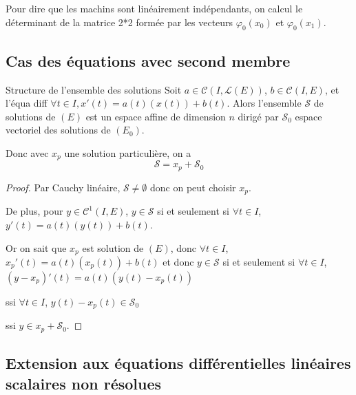 Pour dire que les machins sont linéairement indépendants, on calcul le déterminant 
de la matrice 2*2 formée par les vecteurs $\varphi_0(x_0)$ et $\varphi_0(x_1)$.


\subsection{Cas des équations avec second membre}

\begin{theoreme}{Structure de l'ensemble des solutions}{}
    Soit $a \in \mathscr C(I, \mathscr L(E))$, $b \in \mathscr C(I, E)$, et l'équa diff 
    $\forall t \in I, x'(t) = a(t)(x(t)) + b(t)$. Alors l'ensemble $\mathscr S$ de solutions 
    de $(E)$ est un espace affine de dimension $n$ dirigé par $\mathscr S_0$ espace 
    vectoriel des solutions de $(E_0)$. 

    Donc avec $x_p$ une solution particulière, on a 
    $$\mathscr S = x_p + \mathscr S_0$$
\end{theoreme}

\begin{proof}
    Par Cauchy linéaire, $\mathscr S \neq \emptyset$ donc on peut 
    choisir $x_p$. 
    
    De plus, pour $y \in \mathscr C^1(I, E)$, 
    $y \in \mathscr S$ si et seulement si $\forall t \in I$, $y'(t) = a(t)(y(t)) + b(t)$. 

    Or on sait que $x_p$ est solution de $(E)$, donc $\forall t \in I$, $x_p'(t) = a(t)(x_p(t)) + b(t)$
    et donc $y \in \mathscr S$ si et seulement si $\forall t \in I$, 
    $(y - x_p)'(t) = a(t)(y(t) - x_p(t))$ 

    ssi $\forall t \in I$, $y(t) - x_p(t) \in \mathscr S_0$ 

    ssi $y \in x_p + \mathscr S_0$.
\end{proof}

\subsection{Extension aux équations différentielles linéaires scalaires non résolues}


